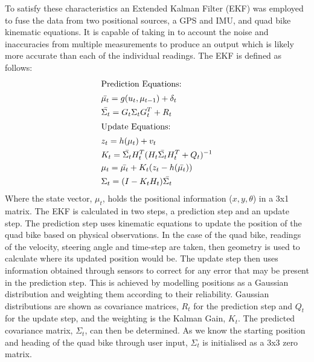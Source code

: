\documentclass[main.tex]{subfiles}
\begin{document}
To satisfy these characteristics an Extended Kalman Filter (EKF) was employed to fuse the data from two positional sources, a GPS and IMU, and quad bike kinematic equations. It is capable of taking in to account the noise and inaccuracies from multiple measurements to produce an output which is likely more accurate than each of the individual readings. The EKF is defined as follows:
\begin{align*}
\shortintertext{Prediction Equations:}
&\bar{\mu_t} = g(u_t, \mu_{t-1}) + \delta_t\\
&\bar{\Sigma_t} = G_t\Sigma_tG_t^T + R_t\\
\shortintertext{Update Equations:}
&z_t = h(\mu_t) + v_t\\
&K_t = \bar{\Sigma_t}H_t^T(H_t\bar{\Sigma_t}H_t^T + Q_t)^{-1}\\
&\mu_t = \bar{\mu_t} + K_t(z_t-h(\bar{\mu_t}))\\
&\Sigma_t = (I - K_tH_t)\bar{\Sigma_t}
\end{align*}
Where the state vector, $\mu_t$, holds the positional information ($x, y, \theta$) in a 3x1 matrix. The EKF is calculated in two steps, a prediction step and an update step. The prediction step uses kinematic equations to update the position of the quad bike based on physical observations. In the case of the quad bike, readings of the velocity, steering angle and time-step are taken, then geometry is used to calculate where its updated position would be. The update step then uses information obtained through sensors to correct for any error that may be present in the prediction step. This is achieved by modelling positions as a Gaussian distribution and weighting them according to their reliability. Gaussian distributions are shown as covariance matrices, $R_t$ for the prediction step and $Q_t$ for the update step, and the weighting is the Kalman Gain, $K_t$. The predicted covariance matrix, $\Sigma_t$, can then be determined. As we know the starting position and heading of the quad bike through user input, $\Sigma_t$ is initialised as a 3x3 zero matrix.
\end{document}

